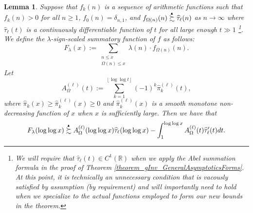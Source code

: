 \documentclass[11pt,reqno,a4letter]{article}
\numberwithin{figure}{section}
\numberwithin{table}{section}
\newcommand{\floor}[1]{\left\lfloor #1 \right\rfloor}
\theoremstyle{plain}
\newtheorem{lemma}[theorem]{Lemma}
\numberwithin{theorem}{section}
\theoremstyle{definition}
\newcommand{\SuccSim}[0]{\overset{_{\scriptsize{\blacktriangle}}}{\succsim}}
\begin{document}
\begin{lemma} 
\label{lemma_CLT_and_AbelSummation} 
Suppose that $f_k(n)$ is a sequence of arithmetic functions 
such that $f_k(n) > 0$ for all $n \geq 1$, $f_0(n) = \delta_{n,1}$, and 
$f_{\Omega(n)}(n) \SuccSim \widehat{\tau}_{\ell}(n)$ as $n \rightarrow \infty$ where 
$\widehat{\tau}_{\ell}(t)$ is a continuously differentiable function of $t$ for all 
large enough $t \gg 1$ \footnote{ 
     We will require that $\widehat{\tau}_{\ell}(t) \in C^{1}(\mathbb{R})$ when we apply the 
     Abel summation formula in the proof of Theorem \ref{theorem_gInv_GeneralAsymptoticsForms}. 
     At this point, it is technically an unnecessary condition that is 
     vacously satisfied by assumption (by requirement) 
     and will importantly need to hold when we specialize to the 
     actual functions employed to form our new bounds in the theorem. 
}.  
We define the $\lambda$-sign-scaled summatory function of $f$ as follows: 
\[
F_{\lambda}(x) := \sum_{\substack{n \leq x \\ \Omega(n) \leq x}} 
     \lambda(n) \cdot f_{\Omega(n)}(n). 
\]
Let 
\[
A_{\Omega}^{(\ell)}(t) := \sum_{k=1}^{\floor{\log\log t}} (-1)^k \widehat{\pi}_k^{(\ell)}(t),  
\]
where $\widehat{\pi}_k(x) \geq \widehat{\pi}_k^{(\ell)}(x) \geq 0$ and 
$\widehat{\pi}_k^{(\ell)}(x)$ is a smooth monotone non-decreasing function of $x$ when $x$ is 
sufficiently large. 
Then we have that 
\[
F_{\lambda}(\log\log x) \SuccSim A_{\Omega}^{(\ell)}(\log\log x) \widehat{\tau}_{\ell}(\log\log x) - 
     \int_1^{\log\log x} 
     A_{\Omega}^{(\ell)}(t) \widehat{\tau}_{\ell}^{\prime}(t) dt. 
\]
\end{lemma}
\end{document}
